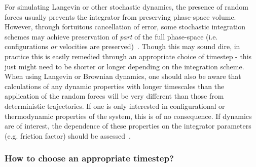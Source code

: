 \documentclass[9pt,bestpractices]{livecoms}
\begin{document}
For simulating Langevin or other stochastic dynamics, the presence of random forces usually prevents the integrator from preserving phase-space volume.
However, through fortuitous cancellation of error, some stochastic integration schemes may achieve preservation of \textit{part} of the full phase-space (i.e. configurations \textit{or} velocities are preserved)~\cite{Fass2018}.
Though this may sound dire, in practice this is easily remedied through an appropriate choice of timestep - this just might need to be shorter or longer depending on the integration scheme.
When using Langevin or Brownian dynamics, one should also be aware that calculations of any dynamic properties with longer timescales than the application of the random forces will be very different than those from deterministic trajectories.
If one is only interested in configurational or thermodynamic properties of the system, this is of no consequence.
If dynamics are of interest, the dependence of these properties on the integrator parameters (e.g. friction factor) should be assessed~\cite{Basconi:2013:J.Chem.TheoryComput.}.


\subsubsection{How to choose an appropriate timestep?}
\end{document}
